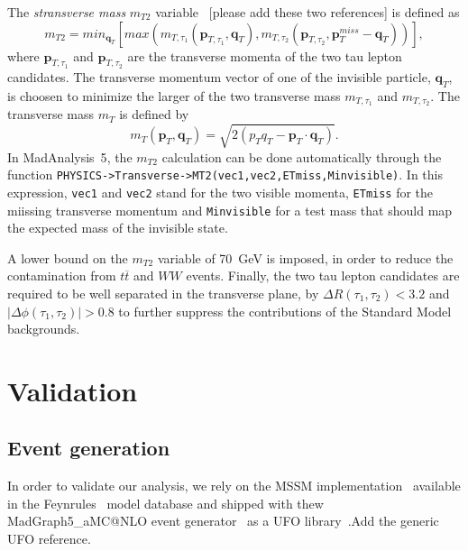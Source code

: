 \documentclass{ws-mpla}
\newcommand{\madanalysis}{{\sc MadAnalysis~5}}
\begin{document}
The \textit{stransverse mass} $m_{T2}$ variable~\cite{Lester:1999tx,Cheng:2008hk} {\color{red}[please add these two references]} is defined as
\begin{equation}
m_{T2} =min_{\mathbf{q}_T}
\left[
max(m_{T,\tau_1}(\mathbf{p}_{T,\tau_1},\mathbf{q}_T),m_{T,\tau_2}(\mathbf{p}_{T,\tau_2},\mathbf{p}^{miss}_T -\mathbf{q}_T))
\right],
\end{equation}   
where $\mathbf{p}_{T,\tau_1}$ and $\mathbf{p}_{T,\tau_2}$ are the transverse momenta of the two tau lepton candidates. The transverse momentum vector of one of the invisible particle, $\mathbf{q}_T$, is choosen to minimize the larger of the two transverse mass $m_{T,\tau_1}$ and $m_{T,\tau_2}$. The transverse mass $m_T$ is defined by
\begin{equation}
m_{T}(\mathbf{p}_T,\mathbf{q}_T) = \sqrt{2(p_T q_T -\mathbf{p}_T\cdot\mathbf{q}_T)}.
\end{equation} 
In \madanalysis, the $m_{T2}$ calculation can be done automatically through the function {\tt PHYSICS->Transverse->MT2(vec1,vec2,ETmiss,Minvisible)}. In this expression, {\tt vec1} and {\tt vec2} stand for the two visible momenta, {\tt ETmiss} for the miissing transverse momentum and {\tt Minvisible} for a test mass that should map the expected mass of the invisible state.

A lower bound on the $m_{T2}$ variable of 70~GeV is imposed, in order to reduce the contamination from $t\overline{t}$ and $WW$ events.
Finally, the two tau lepton candidates are required to be well separated in the transverse plane, by $\Delta R(\tau_1,\tau_2) < 3.2$ and $|\Delta\phi (\tau_1,\tau_2)| > 0.8$ to further suppress the contributions of the Standard Model backgrounds.


\section{Validation}

\subsection{Event generation}

In order to validate our analysis, we rely on the MSSM implementation~\cite{Duhr:2011se} available in the {\sc Feynrules}~\cite{Alloul:2013bka} model database and shipped with thew {\sc MadGraph5\_aMC@NLO} event generator~\cite{Alwall:2014hca} as a UFO library~\cite{Degrande:2011ua}.{\color{red}Add the generic UFO reference.}
\end{document}
